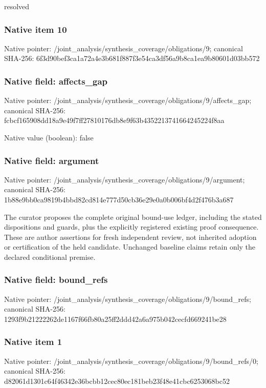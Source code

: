 \documentclass[10pt,a4paper]{article}
\begin{document}
\begingroup\raggedright\sloppy resolved\par\endgroup

\subsubsection{Native item 10}
Native pointer: /joint\_\allowbreak{}analysis/synthesis\_\allowbreak{}coverage/obligations/9; canonical SHA-256: 6f3d90bef3ca1a72a4e3b681f887f3e54ca3df56a9b8ca1ea9b80601d03bb572

\subsubsection{Native field: affects\_\allowbreak{}gap}
Native pointer: /joint\_\allowbreak{}analysis/synthesis\_\allowbreak{}coverage/obligations/9/affects\_\allowbreak{}gap; canonical SHA-256: fcbcf165908dd18a9e49f7ff27810176db8e9f63b4352213741664245224f8aa

Native value (boolean): false

\subsubsection{Native field: argument}
Native pointer: /joint\_\allowbreak{}analysis/synthesis\_\allowbreak{}coverage/obligations/9/argument; canonical SHA-256: 1b88e9bb0ca9819b4bbd82cd814e777d50cb36e29e0a0b006bf4d2f476b3a687

\begingroup\raggedright\sloppy The curator proposes the complete original bound-use ledger,\allowbreak{} including the stated dispositions and guards,\allowbreak{} plus the explicitly registered existing proof consequence. These are author assertions for fresh independent review,\allowbreak{} not inherited adoption or certification of the held candidate. Unchanged baseline claims retain only the declared conditional premise.\par\endgroup

\subsubsection{Native field: bound\_\allowbreak{}refs}
Native pointer: /joint\_\allowbreak{}analysis/synthesis\_\allowbreak{}coverage/obligations/9/bound\_\allowbreak{}refs; canonical SHA-256: 1293f9b21222262de1167f66fb80a25ff2ddd42a6a975b042cecfd669241be28

\subsubsection{Native item 1}
Native pointer: /joint\_\allowbreak{}analysis/synthesis\_\allowbreak{}coverage/obligations/9/bound\_\allowbreak{}refs/0; canonical SHA-256: d82061d1301c64f46342e36bcbb12cec80ec181beb23f48e41cbc6253068bc52
\end{document}
